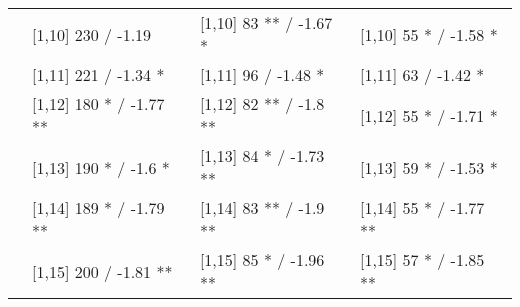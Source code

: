 \begin{table}
\begin{tabular}[t]{llll}
 & {}[1,10] 230  / -1.19 & {}[1,10] 83 ** / -1.67 * & {}[1,10] 55 * / -1.58 *\\
 & {}[1,11] 221  / -1.34 * & {}[1,11] 96  / -1.48 * & {}[1,11] 63  / -1.42 *\\
 & {}[1,12] 180 * / -1.77 ** & {}[1,12] 82 ** / -1.8 ** & {}[1,12] 55 * / -1.71 *\\
\addlinespace
 & {}[1,13] 190 * / -1.6 * & {}[1,13] 84 * / -1.73 ** & {}[1,13] 59 * / -1.53 *\\
 & {}[1,14] 189 * / -1.79 ** & {}[1,14] 83 ** / -1.9 ** & {}[1,14] 55 * / -1.77 **\\
 & {}[1,15] 200  / -1.81 ** & {}[1,15] 85 * / -1.96 ** & {}[1,15] 57 * / -1.85 **\\
\bottomrule
\end{tabular}
\end{table}
